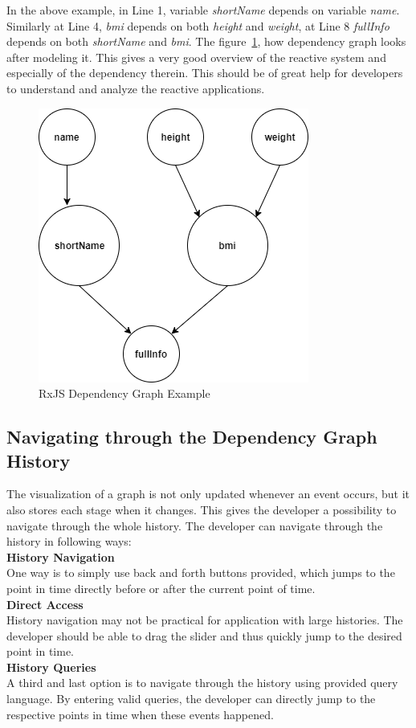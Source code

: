 In the above example, in Line 1, variable \textit{shortName} depends on variable \textit{name}. Similarly at Line 4, \textit{bmi} depends on both \textit{height} and \textit{weight}, at Line 8 \textit{fullInfo} depends on both \textit{shortName} and \textit{bmi}. The figure~\ref{fig:rxjs-dependency-graph-example}, how dependency graph looks after modeling it. This gives a very good overview of the reactive system and especially of the dependency therein. This should be of great help for developers to understand and analyze the reactive applications. 

\begin{figure}[!h]
	\centering
	\includegraphics[scale=0.5,trim=0 0 0 0]{images/rxjs-dependency-graph-example.png}
	\caption{RxJS Dependency Graph Example}
	\label{fig:rxjs-dependency-graph-example}
\end{figure}

\subsection{Navigating through the Dependency Graph History}
The visualization of a graph is not only updated whenever an event occurs, but it also stores each stage when it changes. This gives the developer a possibility to navigate through the whole history. The developer can navigate through the history in following ways:
\\
\textbf{History Navigation}
\\
One way is to simply use back and forth buttons provided, which jumps to the point in time directly before or after the current point of time.
\\
\textbf{Direct Access}
\\
History navigation may not be practical for application with large histories. The developer should be able to drag the slider and thus quickly jump to the desired point in time.
\\
\textbf{History Queries}
\\
A third and last option is to navigate through the history using provided query language. By entering valid queries, the developer can directly jump to the respective points in time when these events happened.

